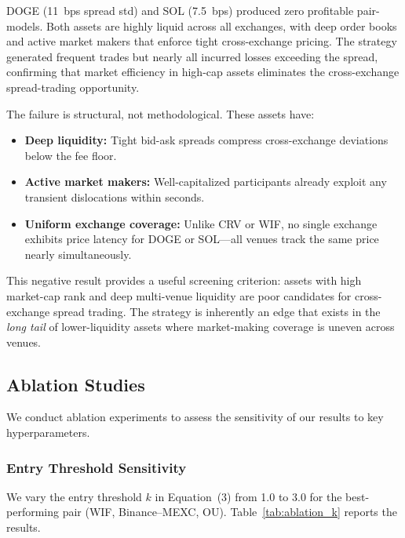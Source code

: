 \documentclass[sigconf,nonacm=false]{acmart}
\begin{document}
DOGE (11~bps spread std) and SOL (7.5~bps) produced zero profitable pair-models. Both assets are highly liquid across all exchanges, with deep order books and active market makers that enforce tight cross-exchange pricing. The strategy generated frequent trades but nearly all incurred losses exceeding the spread, confirming that market efficiency in high-cap assets eliminates the cross-exchange spread-trading opportunity.

The failure is structural, not methodological. These assets have:\vspace{-0.5em}
\begin{itemize}
    \item \textbf{Deep liquidity:} Tight bid-ask spreads compress cross-exchange deviations below the fee floor.
    \item \textbf{Active market makers:} Well-capitalized participants already exploit any transient dislocations within seconds.
    \item \textbf{Uniform exchange coverage:} Unlike CRV or WIF, no single exchange exhibits price latency for DOGE or SOL---all venues track the same price nearly simultaneously.
\end{itemize}\vspace{-0.5em}
This negative result provides a useful screening criterion: assets with high market-cap rank and deep multi-venue liquidity are poor candidates for cross-exchange spread trading. The strategy is inherently an edge that exists in the \emph{long tail} of lower-liquidity assets where market-making coverage is uneven across venues.

\subsection{Ablation Studies}\label{sec:ablation}

We conduct ablation experiments to assess the sensitivity of our results to key hyperparameters.

\subsubsection{Entry Threshold Sensitivity}

We vary the entry threshold $k$ in Equation~(3) from 1.0 to 3.0 for the best-performing pair (WIF, Binance--MEXC, OU). Table~\ref{tab:ablation_k} reports the results.
\end{document}
